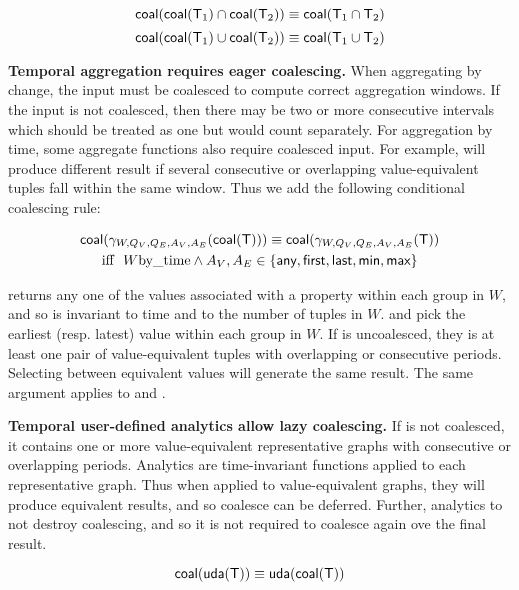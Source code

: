 \begin{equation}
\textsf{coal}(\textsf{coal}(\mathsf{T}_1) \cap \textsf{coal}(\mathsf{T}_2)) \equiv \textsf{coal}(\mathsf{T}_1 \cap \mathsf{T}_2)
\label{rul:intersect}
\end{equation}
\begin{equation}
\textsf{coal}(\textsf{coal}(\mathsf{T}_1) \cup \textsf{coal}(\mathsf{T}_2)) \equiv \textsf{coal}(\mathsf{T}_1 \cup \mathsf{T}_2)
\label{rul:union}
\end{equation}

{\bf Temporal aggregation requires eager coalescing.}  When
aggregating by change, the input must be coalesced to compute correct
aggregation windows.  If the input is not coalesced, then there may be
two or more consecutive intervals which should be treated as one but
would count separately. For aggregation by time, some aggregate
functions also require coalesced input.  For example, 
will produce different result if several consecutive or overlapping
value-equivalent tuples fall within the same window.  Thus we add the
following conditional coalescing rule:

\begin{multline}
\textsf{coal}(\gamma_{W,Q_V,Q_E,A_V,A_E}(\textsf{coal}(\mathsf{T}))) \equiv \textsf{coal}(\gamma_{W,Q_V,Q_E,A_V,A_E}(\mathsf{T})) \\
\text{iff}~~W \text{by\_time} \wedge A_V, A_E \in \{\textsf{any},\textsf{first}, \textsf{last},\textsf{min}, \textsf{max} \}
\label{rul:agg}
\end{multline}

 returns any one of the values associated with a property
within each group in $W$, and so is invariant to time and to the
number of tuples in $W$.   and  pick the
earliest (resp. latest) value within each group in $W$.  If \ttt is
uncoalesced, they is at least one pair of value-equivalent tuples with
overlapping or consecutive periods.  Selecting between equivalent
values will generate the same result.  The same argument applies to
 and .

{\bf Temporal user-defined analytics allow lazy coalescing.} If \trg
is not coalesced, it contains one or more value-equivalent
representative graphs with consecutive or overlapping periods.
Analytics are time-invariant functions applied to each representative
graph.  Thus when applied to value-equivalent graphs, they will
produce equivalent results, and so coalesce can be deferred.  Further,
analytics to not destroy coalescing, and so it is not required to
coalesce again ove the final result.  

\begin{equation}
\textsf{coal}(\textsf{uda}(\mathsf{T})) \equiv \textsf{uda}(\textsf{coal}(\mathsf{T}))
\label{rul:analytic}
\end{equation}

